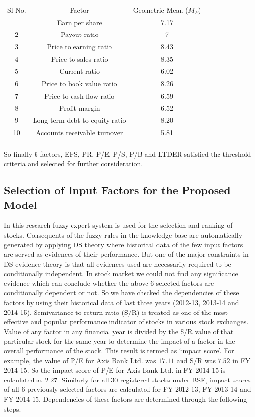 \documentclass{ws-ijufks}
\begin{document}
\begin{table}[ht]
\label{tab:table_gmeans}
{\begin{tabular}{@{}ccc@{}} 
\toprule
Sl No. & Factor & Geometric Mean ($M_F$)\\
\colrule
1 & Earn per share &  7.17\\ 
2 & Payout ratio & 7 \\
3 & Price to earning ratio & 8.43\\
4 & Price to sales ratio & 8.35 \\
5 & Current ratio & 6.02 \\
6 & Price to book value ratio & 8.26\\
7 & Price to cash flow ratio & 6.59\\
8 & Profit margin & 6.52 \\
9 & Long term debt to equity ratio & 8.20 \\
10 & Accounts receivable turnover & 5.81\\
\botrule
\end{tabular}}
\end{table}
So finally 6 factors, EPS, PR, P/E, P/S, P/B and LTDER satisfied the threshold criteria and selected for further 
consideration.  


\subsection{Selection of Input Factors for the Proposed Model}
In this research fuzzy expert system is used for the selection and ranking of stocks. Consequents of the fuzzy rules in 
the knowledge base are automatically generated by applying DS theory where historical data of the few input factors are 
served as evidences of their performance. But one of the major constraints in DS evidence theory is that all evidences 
used are necessarily required to be conditionally independent. In stock market we could not find any significance 
evidence which can conclude whether the above $6$ selected factors are conditionally dependent or not. So we have 
checked the dependencies of these factors by using their historical data of last three years (2012-13, 2013-14 and 
2014-15). Semivariance to return ratio (S/R) is treated as one of the most effective and popular performance indicator 
of stocks in various stock exchanges. Value of any factor in any financial year is divided 	by the S/R value of that 
particular stock for the same year to determine the impact of a factor in the overall performance of the stock. This 
result is termed as `impact score'. For example, the value of P/E for Axis Bank Ltd. was $17.11$ and S/R was $7.52$ in 
FY 2014-15. So the impact score of P/E for Axis Bank Ltd. in FY 2014-15 is calculated as $2.27$. Similarly for all 30 
registered stocks under BSE, impact scores of all 6 previously selected factors are calculated for FY 2012-13, FY 
2013-14 and FY 2014-15. Dependencies of these factors are determined through the following steps.
\end{document}
